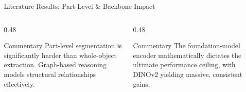 \documentclass[aspectratio=169, 10pt]{beamer}
\begin{document}
\begin{frame}{Literature Results: Part-Level \& Backbone Impact}
    \begin{columns}[T]
        \begin{column}{0.48\textwidth}
            \begin{table}
                \caption{One-Shot Part Segmentation \cite{liu2023matcher, zhang2024bridge}}
            \end{table}
            \begin{alertblock}{Commentary}
                \footnotesize Part-level segmentation is significantly harder than whole-object extraction. Graph-based reasoning models structural relationships effectively.
            \end{alertblock}
        \end{column}
        
        \begin{column}{0.48\textwidth}
            \begin{table}
                \caption{Impact of Backbone on COCO (1-Shot)}
            \end{table}
            \begin{alertblock}{Commentary}
                \footnotesize The foundation-model encoder mathematically dictates the ultimate performance ceiling, with DINOv2 yielding massive, consistent gains.
            \end{alertblock}
        \end{column}
    \end{columns}
\end{frame}
\end{document}
